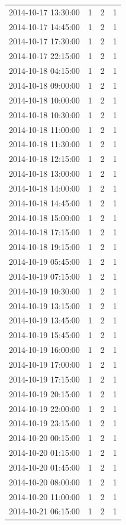 \begin{tabular}{lrrr}
2014-10-17 13:30:00 & 1 & 2 & 1 \\
2014-10-17 14:45:00 & 1 & 2 & 1 \\
2014-10-17 17:30:00 & 1 & 2 & 1 \\
2014-10-17 22:15:00 & 1 & 2 & 1 \\
2014-10-18 04:15:00 & 1 & 2 & 1 \\
2014-10-18 09:00:00 & 1 & 2 & 1 \\
2014-10-18 10:00:00 & 1 & 2 & 1 \\
2014-10-18 10:30:00 & 1 & 2 & 1 \\
2014-10-18 11:00:00 & 1 & 2 & 1 \\
2014-10-18 11:30:00 & 1 & 2 & 1 \\
2014-10-18 12:15:00 & 1 & 2 & 1 \\
2014-10-18 13:00:00 & 1 & 2 & 1 \\
2014-10-18 14:00:00 & 1 & 2 & 1 \\
2014-10-18 14:45:00 & 1 & 2 & 1 \\
2014-10-18 15:00:00 & 1 & 2 & 1 \\
2014-10-18 17:15:00 & 1 & 2 & 1 \\
2014-10-18 19:15:00 & 1 & 2 & 1 \\
2014-10-19 05:45:00 & 1 & 2 & 1 \\
2014-10-19 07:15:00 & 1 & 2 & 1 \\
2014-10-19 10:30:00 & 1 & 2 & 1 \\
2014-10-19 13:15:00 & 1 & 2 & 1 \\
2014-10-19 13:45:00 & 1 & 2 & 1 \\
2014-10-19 15:45:00 & 1 & 2 & 1 \\
2014-10-19 16:00:00 & 1 & 2 & 1 \\
2014-10-19 17:00:00 & 1 & 2 & 1 \\
2014-10-19 17:15:00 & 1 & 2 & 1 \\
2014-10-19 20:15:00 & 1 & 2 & 1 \\
2014-10-19 22:00:00 & 1 & 2 & 1 \\
2014-10-19 23:15:00 & 1 & 2 & 1 \\
2014-10-20 00:15:00 & 1 & 2 & 1 \\
2014-10-20 01:15:00 & 1 & 2 & 1 \\
2014-10-20 01:45:00 & 1 & 2 & 1 \\
2014-10-20 08:00:00 & 1 & 2 & 1 \\
2014-10-20 11:00:00 & 1 & 2 & 1 \\
2014-10-21 06:15:00 & 1 & 2 & 1 \\

\end{tabular}
